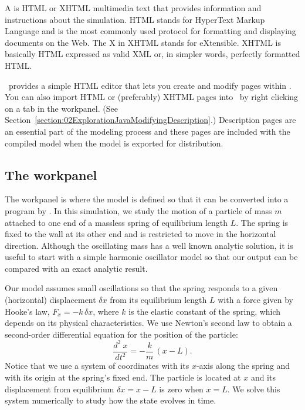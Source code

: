 A  is HTML or XHTML multimedia text that provides information and instructions about the
simulation. HTML stands for HyperText Markup Language and is the most commonly used protocol for formatting and
displaying documents on the Web. The X in XHTML stands for eXtensible. XHTML is basically HTML expressed as valid XML or, in simpler words, perfectly formatted HTML.

\ejs\ provides a simple HTML editor that lets you create and modify pages within \ejs.
You can also import HTML or (preferably) XHTML pages into \ejs\ by right clicking on a tab in the  workpanel. (See
Section~\ref{section:02ExplorationJavaModifyingDescription}.) Description pages are an essential part of the modeling process and
these pages are included with the compiled model when the model is exported for distribution.

\subsection{The  workpanel}\label{section:02ExplorationJavaModel}

The  workpanel is where the model is defined so that it can be converted into a program by \ejs. In this simulation,
we study the motion of a particle of mass $m$ attached to one end of a massless spring of equilibrium length $L$.
The spring is fixed to the wall at its other end and is restricted to move in the horizontal direction. Although the
oscillating mass has a well known analytic solution, it is useful to start with a simple harmonic oscillator model so that
our output can be compared with an exact analytic result.

Our model assumes small oscillations so that the spring responds to a given (horizontal) displacement $\delta x$ from
its equilibrium length $L$ with a force given by Hooke's law, $F_x = - k \,\delta x$, where $k$ is
the elastic constant of the spring, which depends on its physical characteristics. We use Newton's second
law to obtain a second-order differential equation for the position of the particle:
\begin{equation}
  \frac{d^2\ x}{dt^2} = -\frac{k}{m}\,(x-L). \label{eq:02ExplorationJava/SpringBasic}
\end{equation}
Notice that we use a system of coordinates with its $x$-axis along the spring and with its origin at the
spring's fixed end. The particle is located at $x$ and its displacement from equilibrium $\delta x=x-L$ is zero when $x=L$. We solve this system numerically to study how the state evolves in time.

